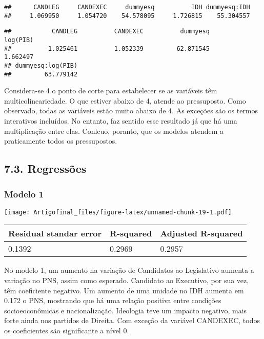 \documentclass[]{article}
\begin{document}
\begin{verbatim}
##      CANDLEG     CANDEXEC     dummyesq          IDH dummyesq:IDH 
##     1.069950     1.054720    54.578095     1.726815    55.304557
\end{verbatim}

\begin{verbatim}
##           CANDLEG          CANDEXEC          dummyesq          log(PIB) 
##          1.025461          1.052339         62.871545          1.662497 
## dummyesq:log(PIB) 
##         63.779142
\end{verbatim}

Considera-se 4 o ponto de corte para estabelecer se as variáveis têm
multicolineariedade. O que estiver abaixo de 4, atende ao pressuposto.
Como observado, todas as variáveis estão muito abaixo de 4. As exceções
são os termos interativos incluídos. No entanto, faz sentido esse
resultado já que há uma multiplicação entre elas. Conlcuo, poranto, que
os modelos atendem a praticamente todos os pressupostos.

\subsection{7.3. Regressões}\label{regressoes}

\subsubsection{Modelo 1}\label{modelo-1}

\texttt{[image: Artigofinal\_files/figure-latex/unnamed-chunk-19-1.pdf]}

\begin{longtable}[]{@{}lll@{}}
\toprule
\textbf{Residual standar error} & \textbf{R-squared} & \textbf{Adjusted
R-squared}\tabularnewline
\midrule
\endhead
0.1392 & 0.2969 & 0.2957\tabularnewline
\bottomrule
\end{longtable}

No modelo 1, um aumento na variação de Candidatos ao Legislativo aumenta
a variação no PNS, assim como esperado. Candidato ao Executivo, por sua
vez, têm coeficiente negativo. Um aumento de uma unidade no IDH aumenta
em 0.172 o PNS, mostrando que há uma relação positiva entre condições
socioeoconômicas e nacionalização. Ideologia teve um impacto negativo,
mais forte ainda nos partidos de Direita. Com exceção da variável
CANDEXEC, todos os coeficientes são significante a nível 0.

\newpage
\end{document}
